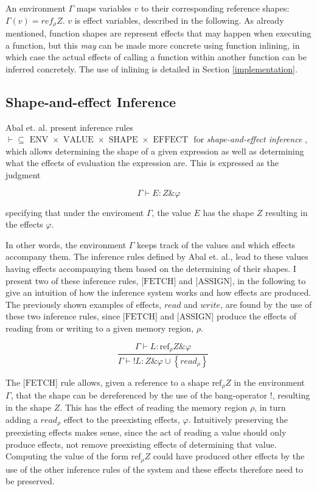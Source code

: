 \newpar An environment $\Gamma$ maps variables $v$ to their corresponding reference shapes: $\Gamma(v) = ref_\rho Z$. $v$ is effect variables, described in the following. As already mentioned, function shapes are represent effects that may happen when executing a function, but this \textit{may} can be made more concrete using function inlining, in which case the actual effects of calling a function within another function can be inferred concretely. The use of inlining is detailed in Section \ref{implementation}. 

\subsection{Shape-and-effect Inference}
Abal et. al. present inference rules $\vdash \subseteq \text { ENV } \times \text { VALUE } \times \text { SHAPE } \times \text { EFFECT }$ for \textit{shape-and-effect inference} \cite{Abal2017EffectiveBF}, which allows determining the shape of a given expression as well as determining what the effects of evaluation the expression are. This is expressed as the judgment 

\begin{equation*}
    \Gamma \vdash E: Z \& \varphi
\end{equation*}

\noindent specifying that under the enviroment $\Gamma$, the value $E$ has the shape $Z$ resulting in the effects $\varphi$.

\newpar In other words, the environment $\Gamma$ keeps track of the values and which effects accompany them. The inference rules defined by Abal et. al., lead to these values having effects accompanying them based on the determining of their shapes. I present two of these inference rules, $\text{[FETCH]}$ and $\text{[ASSIGN]}$, in the following to give an intuition of how the inference system works and how effects are produced. The previously shown examples of effects, $read$ and $write$, are found by the use of these two inference rules, since $\text{[FETCH]}$ and $\text{[ASSIGN]}$ produce the effects of reading from or writing to a given memory region, $\rho$. 

\begin{equation*}
    [\text{FETCH}] \quad \frac{\Gamma \vdash L: \text{ref}_{\rho} Z \& \varphi}{\Gamma \vdash {!L}: Z \& \varphi \cup\left\{r e a d_{\rho}\right\}}
\end{equation*}

\newpar The $\text{[FETCH]}$ rule allows, given a reference to a shape $\text{ref}_{\rho} Z$ in the environment $\Gamma$, that the shape can be dereferenced by the use of the bang-operator $!$, resulting in the shape $Z$. This has the effect of reading the memory region $\rho$, in turn adding a $read_\rho$ effect to the preexisting effects, $\varphi$. Intuitively preserving the preexisting effects makes sense, since the act of reading a value should only produce effects, not remove preexisting effects of determining that value. Computing the value of the form $\text{ref}_{\rho} Z$ could have produced other effects by the use of the other inference rules of the system and these effects therefore need to be preserved.  

